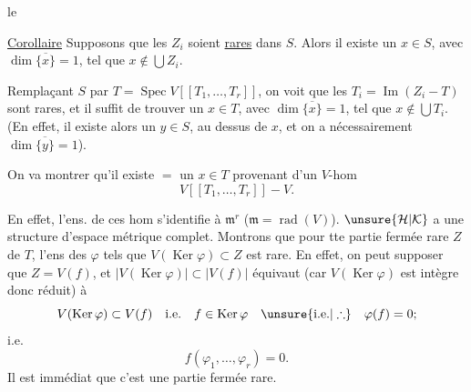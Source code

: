 le

\uline{Corollaire} Supposons que les $Z_i$ soient \uline{rares} dans $S$. Alors il existe un $x\in S$, avec $\dim\overline{\{x\}}=1$, tel que $x\notin\bigcup Z_i$.

Remplaçant $S$ par $T=\operatorname{Spec}V[[T_1,\ldots,T_r]]$,  on voit que les $T_i=\operatorname{Im}(Z_i\mathbin{-}T)$ sont rares, et il suffit de trouver un $x\in T$, avec $\dim\overline{\{x\}}=1$, tel que $x\notin\bigcup T_i$. (En effet, il existe alors un $y\in S$, au dessus de $x$, et on a nécessairement $\dim\overline{\{y\}}=1$).

On va montrer qu'il existe $=$ un $x\in T$ provenant d'un $V$-hom
\[
V[[T_1,\ldots,T_r]]\mathbin{-}V.
\]

En effet, l'ens. de ces hom s'identifie à $\mathfrak m^r$ ($\mathfrak m=\operatorname{rad}(V)$). $\unsure{\mathcal H|\mathcal K}$ a une structure d'espace métrique complet. Montrons que pour tte partie fermée rare $Z$ de $T$, l'ens des $\varphi$ tels que $V(\operatorname{Ker}\varphi)\subset Z$ est rare. En effet, on peut supposer que  $Z=V(f)$,  et $|V(\operatorname{Ker}\varphi)|\subset|V(f)|$ équivaut (car $V(\operatorname{Ker}\varphi)$ est intègre donc réduit) à
\[
V(\operatorname{Ker}\varphi)\subset V(f)\quad\text{i.e.}\quad f\in\operatorname{Ker}\varphi\quad\unsure{\text{i.e.}|\therefore}\quad\varphi(f)=0;
\]
i.e.
\[
f(\varphi_1,\ldots,\varphi_r)=0.
\]
Il est immédiat que c'est une partie fermée rare.

